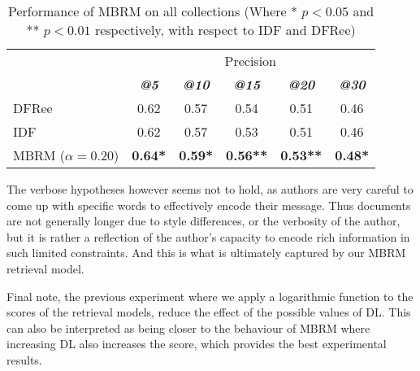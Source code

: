 \begin{table}[b] 	
	  	  	\centering
	  	  	\caption{Performance of MBRM on all collections (Where * $p<0.05$ and ** $p<0.01$ respectively, with respect to IDF and DFRee)} 
	  	 	\begin{tabular}{l|c|c|c|c|c} 	  	 	
	  	 	\cline{2- 6}
	  	 	\multicolumn{1}{c}{}&\multicolumn{5}{c}{Precision} \\ 
	  	 	\cline{2- 6} &
	  	 	\textit{\textbf{@5}} & 
	  	 	\textit{\textbf{@10}} & 
	  	 	\textit{\textbf{@15}} & 
	  	 	\textit{\textbf{@20}} & 
	  	 	\textit{\textbf{@30}} 
	  	 	\tabularnewline
	  	 	\hline
	 	 	 DFRee  & 0.62 & 0.57 & 0.54 & 0.51 & 0.46 \\
	 	 	 IDF  & 0.62 & 0.57 & 0.53 & 0.51 & 0.46 \\
	 	 	 \hline
 	 	 	 \hline
  	  	 	 MBRM ($\alpha=0.20$)  & \textbf{0.64*} & \textbf{0.59*} & \textbf{0.56**} & \textbf{0.53**} & \textbf{0.48*} \\
	  	  	\hline
	  	  	\end{tabular}
	  	  	\label{MBRMPerformance}	
\end{table}


The verbose hypotheses however seems not to hold, as authors are very careful to come up with specific words to effectively encode their message. Thus documents are not generally longer due to style differences, or the verbosity of the author, but it is rather a reflection of the author's capacity to encode rich information in such limited constraints. And this is what is ultimately captured by our MBRM retrieval model.


Final note, the previous experiment where we apply a logarithmic function to the scores of the retrieval models, reduce the effect of the possible values of DL. This can also be interpreted as being closer to the behaviour of MBRM where increasing DL also increases the score, which provides the best experimental results.
